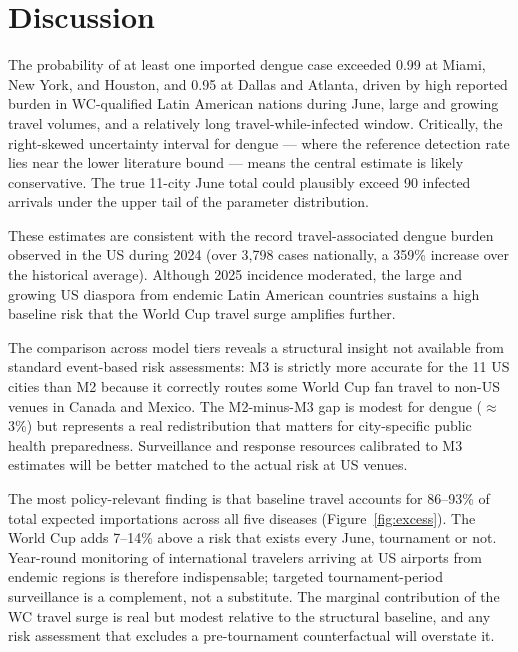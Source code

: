 \documentclass[12pt, a4paper]{article}
\begin{document}
\section{Discussion}

The probability of at least one imported dengue case exceeded 0.99 at
Miami, New York, and Houston, and 0.95 at Dallas and Atlanta, driven
by high reported burden in WC-qualified Latin
American nations during June, large and growing travel volumes, and
a relatively long travel-while-infected window. Critically, the
right-skewed uncertainty interval for dengue --- where the reference
detection rate lies near the lower literature bound --- means the
central estimate is likely conservative. The true 11-city June total
could plausibly exceed 90 infected arrivals under the upper tail of
the parameter distribution.

These estimates are consistent with the record travel-associated
dengue burden observed in the US during 2024 (over 3,798 cases
nationally, a 359\% increase over the historical average). Although
2025 incidence moderated, the large and growing US diaspora from
endemic Latin American countries sustains a high baseline risk that
the World Cup travel surge amplifies further.

The comparison across model tiers reveals a structural insight
not available from standard event-based risk assessments: M3 is
strictly more accurate for the 11 US cities than M2 because it
correctly routes some World Cup fan travel to non-US venues in
Canada and Mexico. The M2-minus-M3 gap is modest for dengue
($\approx$3\%) but represents a real redistribution that matters
for city-specific public health preparedness. Surveillance and
response resources calibrated to M3 estimates will be better
matched to the actual risk at US venues.

The most policy-relevant finding is that baseline travel accounts
for 86--93\% of total expected importations across all five diseases
(Figure~\ref{fig:excess}). The World Cup adds 7--14\% above a risk
that exists every June, tournament or not. Year-round monitoring of
international travelers arriving at US airports from endemic regions
is therefore indispensable; targeted tournament-period surveillance
is a complement, not a substitute. The marginal contribution of the
WC travel surge is real but modest relative to the structural
baseline, and any risk assessment that excludes a pre-tournament
counterfactual will overstate it.
\end{document}

